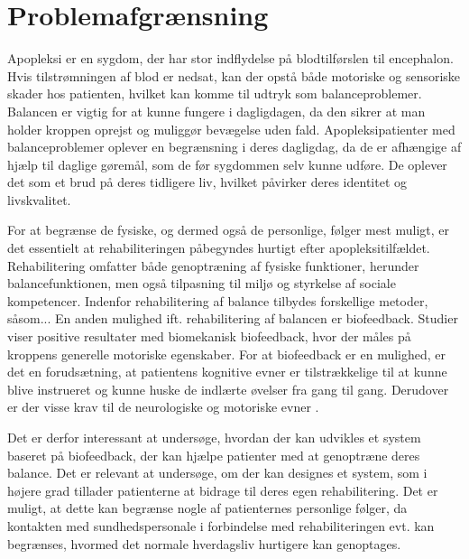 \section{Problemafgrænsning}
Apopleksi er en sygdom, der har stor indflydelse på blodtilførslen til encephalon. Hvis tilstrømningen af blod er nedsat, kan der opstå både motoriske og sensoriske skader hos patienten, hvilket kan komme til udtryk som balanceproblemer. Balancen er vigtig for at kunne fungere i dagligdagen, da den sikrer at man holder kroppen oprejst og muliggør bevægelse uden fald. \cite{Nichols1997} Apopleksipatienter med balanceproblemer oplever en begrænsning i deres dagligdag, da de er afhængige af hjælp til daglige gøremål, som de før sygdommen selv kunne udføre. De oplever det som et brud på deres tidligere liv, hvilket påvirker deres identitet og livskvalitet. \cite{Sundhedsstyrelsen2010}

For at begrænse de fysiske, og dermed også de personlige, følger mest muligt, er det essentielt at rehabiliteringen påbegyndes hurtigt efter apopleksitilfældet. Rehabilitering omfatter både genoptræning af fysiske funktioner, herunder balancefunktionen, men også tilpasning til miljø og styrkelse af sociale kompetencer. Indenfor rehabilitering af balance tilbydes forskellige metoder, såsom...  En anden mulighed ift. rehabilitering af balancen er biofeedback. Studier viser positive resultater med biomekanisk biofeedback, hvor der måles på kroppens generelle motoriske egenskaber. \cite{Giggins2013} For at biofeedback er en mulighed, er det en forudsætning, at patientens kognitive evner er tilstrækkelige til at kunne blive instrueret og kunne huske de indlærte øvelser fra gang til gang. Derudover er der visse krav til de neurologiske og motoriske evner . \cite{Middaugh1989}

Det er derfor interessant at undersøge, hvordan der kan udvikles et system baseret på biofeedback, der kan hjælpe patienter med at genoptræne deres balance. Det er relevant at undersøge, om der kan designes et system, som i højere grad tillader patienterne at bidrage til deres egen rehabilitering. Det er muligt, at dette kan begrænse nogle af patienternes personlige følger, da kontakten med sundhedspersonale i forbindelse med rehabiliteringen evt. kan begrænses, hvormed det normale hverdagsliv hurtigere kan genoptages. 

